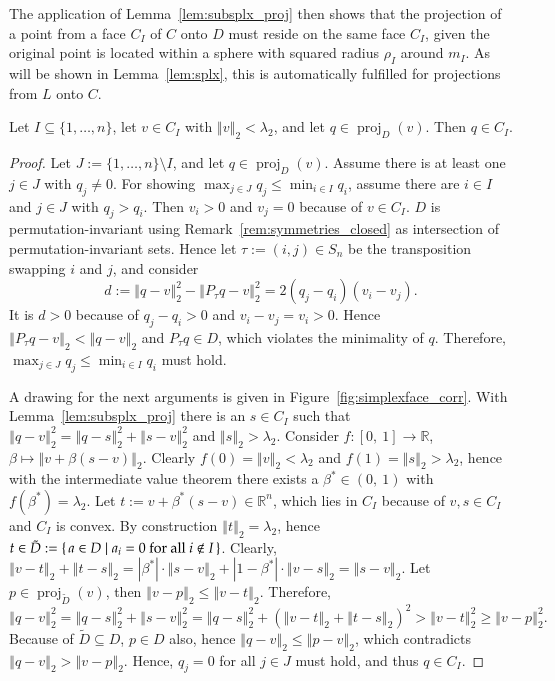 \documentclass[twoside,11pt]{article}
\DeclareMathOperator{\proj}{proj}
\newcommand{\intervalcc}[2]{\left[#1,\ #2\right]}
\newcommand{\intervaloo}[2]{\left(#1,\ #2\right)}
\newcommand{\R}{\mathbb{R}}
\newcommand{\0}{\mathcal{O}}
\newcommand{\norm}[1]{\left\Vert#1\right\Vert}
\newcommand{\abs}[1]{\left\vert #1 \right\vert}
\newcommand{\discint}[2]{\{#1,\dotsc,#2\}}
\begin{document}
\noindent
The application of Lemma~\ref{lem:subsplx_proj} then shows that the projection of a point from a face $C_I$ of $C$ onto $D$ must reside on the same face $C_I$, given the original point is located within a sphere with squared radius $\rho_I$ around $m_I$.
As will be shown in Lemma~\ref{lem:splx}, this is automatically fulfilled for projections from $L$ onto $C$.
\begin{corollary}
\label{cor:subsplx_proj}
Let $I\subseteq\discint{1}{n}$, let $v\in C_I$ with $\norm{v}_2 < \lambda_2$, and let $q\in\proj_D(v)$.
Then $q\in C_I$.
\end{corollary}
\begin{proof}
Let $J := \discint{1}{n}\setminus I$, and let $q\in\proj_D(v)$.
Assume there is at least one $j\in J$ with $q_j \neq 0$.
For showing $\max_{j\in J}q_j \leq \min_{i\in I}q_i$, assume there are $i\in I$ and $j\in J$ with $q_j > q_i$.
Then $v_i > 0$ and $v_j = 0$ because of $v\in C_I$.
$D$ is permutation-invariant using Remark~\ref{rem:symmetries_closed} as intersection of permutation-invariant sets.
Hence let $\tau := (i, j)\in S_n$ be the transposition swapping $i$ and $j$, and consider
\begin{displaymath}
  d := \norm{q - v}_2^2 - \norm{P_\tau q - v}_2^2 = 2\left(q_j - q_i\right)\left(v_i - v_j\right)\text{.}
\end{displaymath}
It is $d > 0$ because of $q_j - q_i > 0$ and $v_i - v_j = v_i > 0$.
Hence $\norm{P_\tau q - v}_2 < \norm{q - v}_2$ and $P_\tau q\in D$, which violates the minimality of $q$.
Therefore, $\max_{j\in J}q_j \leq \min_{i\in I}q_i$ must hold.

A drawing for the next arguments is given in Figure~\ref{fig:simplexface_corr}.
With Lemma~\ref{lem:subsplx_proj} there is an $s\in C_I$ such that $\norm{q - v}_2^2 = \norm{q - s}_2^2 + \norm{s - v}_2^2$ and $\norm{s}_2 > \lambda_2$.
Consider $f\colon\intervalcc{0}{1}\to\R$, $\beta\mapsto\norm{v + \beta\left(s - v\right)}_2$.
Clearly $f(0) = \norm{v}_2 < \lambda_2$ and $f(1) = \norm{s}_2 > \lambda_2$, hence with the intermediate value theorem there exists a $\beta^*\in\intervaloo{0}{1}$ with $f(\beta^*) = \lambda_2$.
Let $t := v + \beta^*\left(s - v\right)\in\R^n$, which lies in $C_I$ because of $v,s\in C_I$ and $C_I$ is convex.
By construction $\norm{t}_2 = \lambda_2$, hence $t\in\tilde{D} := \set{a\in D|a_i = 0\text{ for all }i\not\in I}$.
Clearly, $\norm{v - t}_2 + \norm{t - s}_2 = \abs{\beta^*}\cdot\norm{s-v}_2 + \abs{1 - \beta^*}\cdot\norm{v-s}_2 = \norm{s-v}_2$.
Let $p\in\proj_{\tilde{D}}(v)$, then $\norm{v - p}_2 \leq \norm{v - t}_2$.
Therefore,
\begin{displaymath}
  \norm{q - v}_2^2 = \norm{q - s}_2^2 + \norm{s - v}_2^2 = \norm{q - s}_2^2 + \left(\norm{v - t}_2 + \norm{t - s}_2\right)^2
  > \norm{v - t}_2^2 \geq \norm{v - p}_2^2\text{.}
\end{displaymath}
Because of $\tilde{D}\subseteq D$, $p\in D$ also, hence $\norm{q - v}_2 \leq \norm{p - v}_2$, which contradicts $\norm{q - v}_2 > \norm{v - p}_2$.
Hence, $q_j = 0$ for all $j\in J$ must hold, and thus $q\in C_I$.
\end{proof}
\end{document}
